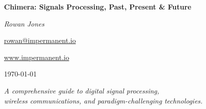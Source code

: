 \begin{titlepage}
    \centering
    \vspace*{2cm}
    
    {\Huge\bfseries\color{NavyBlue} Chimera: Signals Processing, Past, Present \& Future\par}
    \vspace{1cm}
    {\Large\itshape Rowan Jones\par}
    \vspace{0.2cm}
    {\small\href{mailto:rowan@impermanent.io}{rowan@impermanent.io}\par}
    {\small\url{www.impermanent.io}\par}
    \vspace{0.5cm}
    {\large \today\par}
    
    \vspace{2cm}
    
    {\large\itshape
    A comprehensive guide to digital signal processing,\\
    wireless communications, and paradigm-challenging technologies.\par}
    
    \vfill
    
\end{titlepage}
